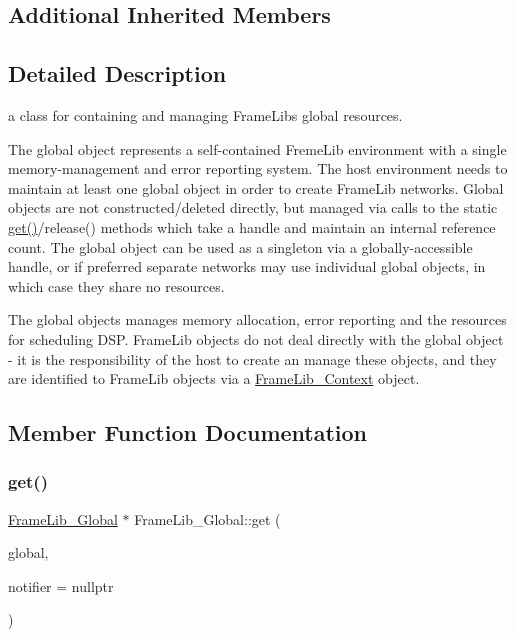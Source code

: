 \subsection*{Additional Inherited Members}


\subsection{Detailed Description}
a class for containing and managing Frame\+Lib\textquotesingle{}s global resources. 

The global object represents a self-\/contained Freme\+Lib environment with a single memory-\/management and error reporting system. The host environment needs to maintain at least one global object in order to create Frame\+Lib networks. Global objects are not constructed/deleted directly, but managed via calls to the static \hyperlink{class_frame_lib___global_a2d24a293da4c71e089e4738cfbbf6aec}{get()}/release() methods which take a handle and maintain an internal reference count. The global object can be used as a singleton via a globally-\/accessible handle, or if preferred separate networks may use individual global objects, in which case they share no resources.

The global objects manages memory allocation, error reporting and the resources for scheduling D\+SP. Frame\+Lib objects do not deal directly with the global object -\/ it is the responsibility of the host to create an manage these objects, and they are identified to Frame\+Lib objects via a \hyperlink{class_frame_lib___context}{Frame\+Lib\+\_\+\+Context} object. 

\subsection{Member Function Documentation}
\mbox{\label{class_frame_lib___global_a2d24a293da4c71e089e4738cfbbf6aec}} 
\subsubsection{\texorpdfstring{get()}{get()}}
{\footnotesize\ttfamily \hyperlink{class_frame_lib___global}{Frame\+Lib\+\_\+\+Global} $\ast$ Frame\+Lib\+\_\+\+Global\+::get (\begin{DoxyParamCaption}\item[{\hyperlink{class_frame_lib___global}{Frame\+Lib\+\_\+\+Global} $\ast$$\ast$}]{global,  }\item[{\hyperlink{struct_frame_lib___error_reporter_1_1_host_notifier}{Frame\+Lib\+\_\+\+Error\+Reporter\+::\+Host\+Notifier} $\ast$}]{notifier = {\ttfamily nullptr} }\end{DoxyParamCaption})\hspace{0.3cm}{\ttfamily [static]}}

